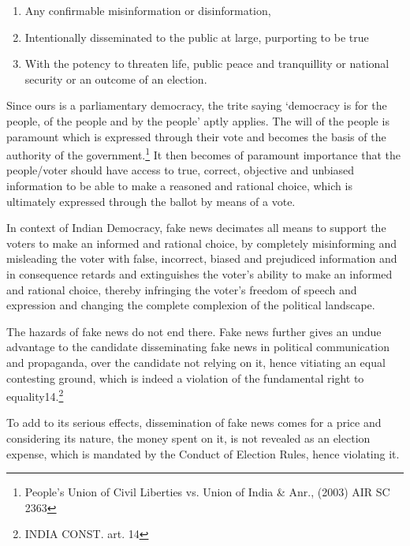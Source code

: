\begin{multicols}{2}
\begin{enumerate}
\itemsep=0pt
\item Any confirmable misinformation or disinformation, 

\item Intentionally disseminated to the public at large, purporting to be true 

\item With the potency to threaten life, public peace and tranquillity or national security or
an outcome of an election.
\end{enumerate}

\vspace{-.3cm}


\vspace{-.15cm}

\noi
Since ours is a parliamentary democracy, the trite saying ‘democracy is for the people, of the
people and by the people’ aptly applies. The will of the people is paramount which is
expressed through their vote and becomes the basis of the authority of the 
government.\footnote{People's Union of Civil Liberties vs. Union of India \& Anr., (2003) AIR SC 2363} It
then becomes of paramount importance that the people/voter should have access to true,
correct, objective and unbiased information to be able to make a reasoned and rational choice,
which is ultimately expressed through the ballot by means of a vote.

\noi
In context of Indian Democracy, fake news decimates all means to support the voters to make
an informed and rational choice, by completely misinforming and misleading the voter with
false, incorrect, biased and prejudiced information and in consequence retards and
extinguishes the voter’s ability to make an informed and rational choice, thereby infringing
the voter’s freedom of speech and expression and changing the complete complexion of the
political landscape.

\noi
The hazards of fake news do not end there. Fake news further gives an undue advantage to
the candidate disseminating fake news in political communication and propaganda, over the 
candidate not relying on it, hence vitiating an equal contesting ground, which is indeed a
violation of the fundamental right to equality14.\footnote{INDIA CONST. art. 14} 

\noi
To add to its serious effects, dissemination of fake news comes for a price and considering its
nature, the money spent on it, is not revealed as an election expense, which is mandated by
the Conduct of Election Rules, hence violating it.


\end{multicols}

